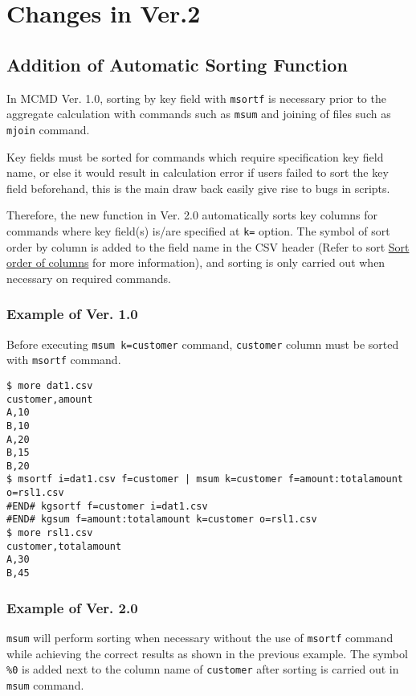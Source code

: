 
%

\section{Changes in Ver.2\label{sect:changes}}
\subsection{Addition of Automatic Sorting Function\label{sect:changes}}

In MCMD Ver. 1.0, sorting by key field with \verb|msortf| is necessary  prior to the aggregate calculation with commands such as \verb|msum| and joining of files such as \verb|mjoin| command. 

Key fields must be sorted for commands which require specification key field name, or else it would result in calculation error if users failed to sort the key field beforehand, this is the main draw back  easily give rise to bugs in scripts. 

Therefore, the new function in Ver. 2.0 automatically sorts key columns for commands where key field(s) is/are specified at \verb|k=| option. The symbol of sort order by column is added to the field name in the CSV header (Refer to sort \hyperref[sect:csv_sort]{Sort order of columns} for more information),  and sorting is only carried out when necessary on required commands. 

\subsubsection*{Example of Ver. 1.0}

Before executing \verb|msum k=customer| command, \verb|customer| column must be sorted with \verb|msortf| command. 

\begin{Verbatim}[baselinestretch=0.7,frame=single]
$ more dat1.csv
customer,amount
A,10
B,10
A,20
B,15
B,20
$ msortf i=dat1.csv f=customer | msum k=customer f=amount:totalamount o=rsl1.csv
#END# kgsortf f=customer i=dat1.csv
#END# kgsum f=amount:totalamount k=customer o=rsl1.csv
$ more rsl1.csv
customer,totalamount
A,30
B,45
\end{Verbatim}

\subsubsection*{Example of Ver. 2.0}


\verb|msum| will perform sorting when necessary without the use of \verb|msortf| command while achieving the correct results as shown in the previous example. The symbol \verb|%0| is added next to the column name of \verb|customer| after sorting is carried out in \verb|msum| command.  

